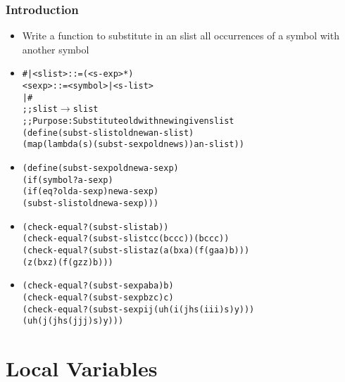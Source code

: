 \documentclass{beamer}
\newcommand{\arrow}{\(\rightarrow\)}
\newcommand{\elist}{\texttt{\textquotesingle{()}}}
\newcommand{\quot}{\texttt{\textquotesingle{}}}
\begin{document}
\begin{frame}[fragile]
\frametitle{Introduction}
\begin{scriptsize}
\begin{itemize}
\item<1-> Write a function to substitute in an slist all occurrences of a symbol with another symbol

\item<2->
\begin{alltt}
#| <slist> ::= ({<s-exp>}*)
    <sexp> ::= <symbol> | <s-list>
|#
;; slist \arrow{} slist
;; Purpose: Substitute old with new in given slist
(define (subst-slist old new an-slist)
  (map (lambda (s) (subst-sexp old new s)) an-slist))

\end{alltt}

\item<3->
\begin{alltt}
(define (subst-sexp old new a-sexp)
  (if (symbol? a-sexp)
      (if (eq? old a-sexp) new a-sexp)
      (subst-slist old new a-sexp)))
\end{alltt}

\item<2->
\begin{alltt}
(check-equal? (subst-slist \quot{}a \quot{}b \elist{}) \elist{})
(check-equal? (subst-slist \quot{}c \quot{}c \quot{}(b c c c)) \quot{}(b c c c))
(check-equal? (subst-slist \quot{}a \quot{}z \quot{}(a (b x a) (f (g a a) b)))
              \quot{}(z (b x z) (f (g z z) b)))
\end{alltt}

\item<3->
\begin{alltt}
(check-equal? (subst-sexp \quot{}a \quot{}b \quot{}a) \quot{}b)
(check-equal? (subst-sexp \quot{}b \quot{}z \quot{}c) \quot{}c)
(check-equal? (subst-sexp \quot{}i \quot{}j \quot{}(u h (i (j h s (i i i) s) y)))
              \quot{}(u h (j (j h s (j j j) s) y)))
\end{alltt}


\end{itemize}
\end{scriptsize}
\end{frame}


\section{Local Variables}
\end{document}

